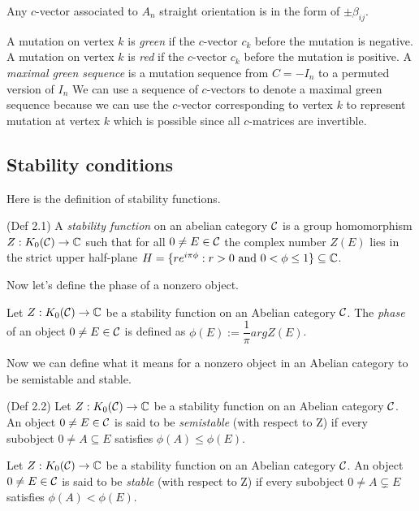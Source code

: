 \begin{lemma} \label{CVA}
Any $c$-vector associated to $A_n$ straight orientation is in the form of $\pm\beta_{ij}$.
\end{lemma}
\indent A mutation on vertex $k$ is \textit{green} if the $c$-vector $c_k$ before the mutation is negative.  A mutation on vertex $k$ is \textit{red} if the $c$-vector $c_k$ before the mutation is positive. A \textit{maximal green sequence} is a mutation sequence from $C=-I_n$ to a permuted version of $I_n$ We can use a sequence of $c$-vectors to denote a maximal green sequence because we can use the $c$-vector corresponding to vertex $k$ to represent mutation at vertex $k$ which is possible since all $c$-matrices are invertible.\\
\subsection{Stability conditions}
\indent Here is the definition of stability functions.\\
\begin{definition}
\cite{B07}(Def 2.1) A \textit{stability function} on an abelian category $\mathcal{C}$ is a group homomorphism $Z : K_0(\mathcal{C})\to\mathbb{C}$ such that for all $0\neq E\in\mathcal{C}$ the complex number $Z(E)$ lies in the strict upper half-plane $H = \{re^{i\pi\phi} : r > 0\text{ and }0 < \phi\leq 1\}\subseteq\mathbb{C}$.
\end{definition}
\indent Now let's define the phase of a nonzero object.\\
\begin{definition}
\cite{B07} Let $Z : K_0(\mathcal{C})\to\mathbb{C}$ be a stability function on an Abelian category $\mathcal{C}$. The \textit{phase} of an object $0\neq E\in\mathcal{C}$ is defined as $\phi(E):=\dfrac1\pi arg Z(E)$.
\end{definition}
\indent Now we can define what it means for a nonzero object in an Abelian category to be semistable and stable.\\
\begin{definition}
\cite{B07}(Def 2.2) Let $Z : K_0(\mathcal{C})\to\mathbb{C}$ be a stability function on an Abelian category $\mathcal{C}$. An object $0\neq E\in\mathcal{C}$ is said to be \textit{semistable} (with respect to Z) if every
subobject $0 \neq A\subseteq E$ satisfies $\phi(A) \leq \phi(E)$.
\end{definition}
\begin{definition}
\cite{B07} Let $Z : K_0(\mathcal{C})\to\mathbb{C}$ be a stability function on an Abelian category $\mathcal{C}$. An object $0\neq E\in\mathcal{C}$ is said to be \textit{stable} (with respect to Z) if every
subobject $0 \neq A\subsetneq E$ satisfies $\phi(A) < \phi(E)$.
\end{definition}
